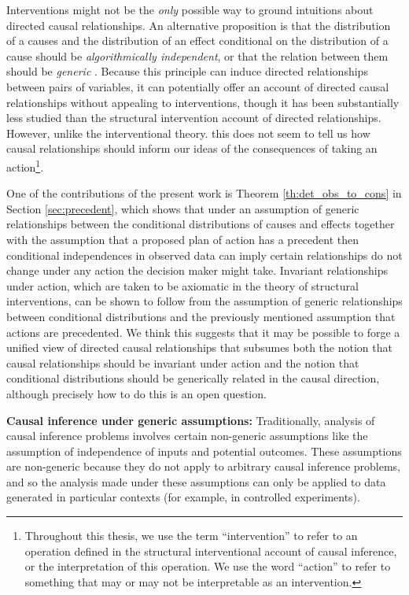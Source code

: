 Interventions might not be the \emph{only} possible way to ground intuitions about directed causal relationships. An alternative proposition is that the distribution of a causes and the distribution of an effect conditional on the distribution of a cause should be \emph{algorithmically independent}, or that the relation between them should be \emph{generic} \citep{lemeire_replacing_2013}. Because this principle can induce directed relationships between pairs of variables, it can potentially offer an account of directed causal relationships without appealing to interventions, though it has been substantially less studied than the structural intervention account of directed relationships. However, unlike the interventional theory. this does not seem to tell us how causal relationships should inform our ideas of the consequences of taking an action\footnote{Throughout this thesis, we use the term ``intervention'' to refer to an operation defined in the structural interventional account of causal inference, or the interpretation of this operation. We use the word ``action'' to refer to something that may or may not be interpretable as an intervention.}.

One of the contributions of the present work is Theorem \ref{th:det_obs_to_cons} in Section \ref{sec:precedent}, which shows that under an assumption of generic relationships between the conditional distributions of causes and effects together with the assumption that a proposed plan of action has a precedent then conditional independences in observed data can imply certain relationships do not change under any action the decision maker might take. Invariant relationships under action, which are taken to be axiomatic in the theory of structural interventions, can be shown to follow from the assumption of generic relationships between conditional distributions and the previously mentioned assumption that actions are precedented. We think this suggests that it may be possible to forge a unified view of directed causal relationships that subsumes both the notion that causal relationships should be invariant under action and the notion that conditional distributions should be generically related in the causal direction, although precisely how to do this is an open question.

\textbf{Causal inference under generic assumptions:} Traditionally, analysis of causal inference problems involves certain non-generic assumptions like the assumption of independence of inputs and potential outcomes. These assumptions are non-generic because they do not apply to arbitrary causal inference problems, and so the analysis made under these assumptions can only be applied to data generated in particular contexts (for example, in controlled experiments).

